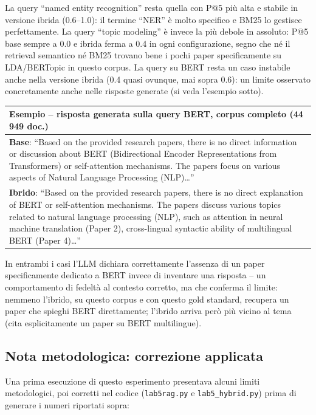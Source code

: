 \documentclass[12pt,a4paper]{article}
\begin{document}
La query ``named entity recognition'' resta quella con P@5 pi\`u alta e stabile in versione ibrida (0.6--1.0): il termine ``NER'' \`e molto specifico e BM25 lo gestisce perfettamente. La query ``topic modeling'' \`e invece la pi\`u debole in assoluto: P@5 base sempre a 0.0 e ibrida ferma a 0.4 in ogni configurazione, segno che n\'e il retrieval semantico n\'e BM25 trovano bene i pochi paper specificamente su LDA/BERTopic in questo corpus. La query su BERT resta un caso instabile anche nella versione ibrida (0.4 quasi ovunque, mai sopra 0.6): un limite osservato concretamente anche nelle risposte generate (si veda l'esempio sotto).

\begin{table}[H]
\centering
\begin{tabular}{p{14.5cm}}
\toprule
\textbf{Esempio -- risposta generata sulla query BERT, corpus completo (44\,949 doc.)} \\
\midrule
\textbf{Base}: ``Based on the provided research papers, there is no direct information or discussion about BERT (Bidirectional Encoder Representations from Transformers) or self-attention mechanisms. The papers focus on various aspects of Natural Language Processing (NLP)\ldots'' \\[0.5em]
\textbf{Ibrido}: ``Based on the provided research papers, there is no direct explanation of BERT or self-attention mechanisms. The papers discuss various topics related to natural language processing (NLP), such as attention in neural machine translation (Paper 2), cross-lingual syntactic ability of multilingual BERT (Paper 4)\ldots'' \\
\bottomrule
\end{tabular}
\end{table}

In entrambi i casi l'LLM dichiara correttamente l'assenza di un paper specificamente dedicato a BERT invece di inventare una risposta -- un comportamento di fedelt\`a al contesto corretto, ma che conferma il limite: nemmeno l'ibrido, su questo corpus e con questo gold standard, recupera un paper che spieghi BERT direttamente; l'ibrido arriva per\`o pi\`u vicino al tema (cita esplicitamente un paper su BERT multilingue).

\subsection{Nota metodologica: correzione applicata}
\label{sec:nota-metodologica}

Una prima esecuzione di questo esperimento presentava alcuni limiti metodologici, poi corretti nel codice (\texttt{lab5rag.py} e \texttt{lab5\_hybrid.py}) prima di generare i numeri riportati sopra:
\end{document}
